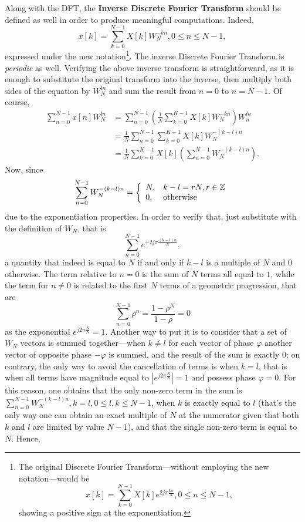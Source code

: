 \documentclass[\documentfontsize, twocolumn]{\classname}
\begin{document}
Along with the DFT, the \textbf{Inverse Discrete Fourier Transform} should be defined as well in order to produce meaningful computations. Indeed,
\begin{equation}\label{eqn:inverseDiscreteFourierTransformWn}
    x[k] = \sum_{k=0}^{N-1} X[k] W_N^{-kn}, 0 \leq n \leq N-1,
\end{equation}
expressed under the new notation\footnote{
    The original Discrete Fourier Transform---without employing the new notation---would be
    \[
        x[k] = \sum_{k=0}^{N-1} X[k] e^{2j\pi\frac{kn}{N}}, 0 \leq n \leq N-1,
    \]
    showing a positive sign at the exponentiation.
}. The inverse Discrete Fourier Transform is \emph{periodic} as well.
Verifying the above inverse transform is straightforward, as it is enough to substitute the original transform into the inverse, then multiply both sides of the equation by $W_N^{ln}$ and sum the result from $n=0$ to $n=N-1$. Of course,
\begin{align*}
    \sum_{n=0}^{N-1} x[n] W_N^{ln}
    &= \sum_{n=0}^{N-1}\left(\frac 1 N\sum_{k=0}^{K-1} X[k] W_N^{-kn}\right)W_n^{ln}\\
    &= \frac 1 N \sum_{n=0}^{N-1}\sum_{k=0}^{K-1} X[k] W_N^{-(k-l)n}\\
    &= \frac 1 N \sum_{k=0}^{K-1} X[k] \left(\sum_{n=0}^{N-1}W_N^{-(k-l)n}\right).
\end{align*}
Now, since
\begin{equation}\label{eqn:dftWnProperty}
    \sum_{n=0}^{N-1}W_N^{-(k-l)n} = \left\{\begin{array}{ll} N, & k - l = rN, r \in \mathbb Z\\ 0, & \mbox{otherwise}\end{array}\right.
\end{equation}
due to the exponentiation properties. In order to verify that, just substitute with the definition of $W_N$, that is \[\sum_{n=0}^{N-1}e^{+2j\pi\frac{(k-l)n}{N}},\] a quantity that indeed is equal to $N$ if and only if $k-l$ is a multiple of $N$ and $0$ otherwise. The term relative to $n=0$ is the sum of $N$ terms all equal to $1$, while the term for $n\neq 0$ is related to the first $N$ terms of a geometric progression, that are \[\sum_{n=0}^{N-1}\rho^n = \frac{1-\rho^N}{1 - \rho} = 0\] as the exponential $e^{j2\pi\frac{N}{N}} = 1$. Another way to put it is to consider that a set of $W_N$ vectors is summed together---when $k\neq l$ for each vector of phase $\varphi$ another vector of opposite phase $-\varphi$ is summed, and the result of the sum is exactly $0$; on contrary, the only way to avoid the cancellation of terms is when $k = l$, that is when all terms have magnitude equal to $|e^{j2\pi\frac{N}{N}}| = 1$ and possess phase $\varphi = 0$. For this reason, one obtains that the only non-zero term in the sum is $\sum_{n=0}^{N-1} W_N^{-(k-l)n}, k=l, 0\leq l,k \leq N-1$, when $k$ is exactly equal to $l$ (that's the only way one can obtain an exact multiple of $N$ at the numerator given that both $k$ and $l$ are limited by value $N-1$), and that the single non-zero term is equal to $N$. Hence,
\end{document}
